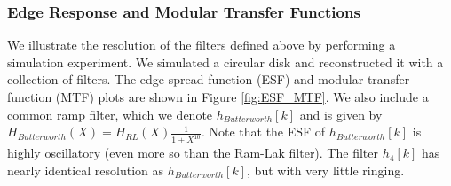 \subsubsection{Edge Response and Modular Transfer Functions}

We illustrate the resolution of the filters defined above by performing a simulation experiment.  We simulated a circular disk and reconstructed it with a collection of filters.  The edge spread function (ESF) and modular transfer function (MTF) plots are shown in Figure \ref{fig:ESF_MTF}.  We also include a common ramp filter, which we denote $h_{Butterworth}[k]$ and is given by $H_{Butterworth}(X) = H_{RL}(X) \frac{1}{1+X^{10}}$.  Note that the ESF of $h_{Butterworth}[k]$ is highly oscillatory (even more so than the Ram-Lak filter).  The filter $h_4[k]$ has nearly identical resolution as $h_{Butterworth}[k]$, but with very little ringing.

